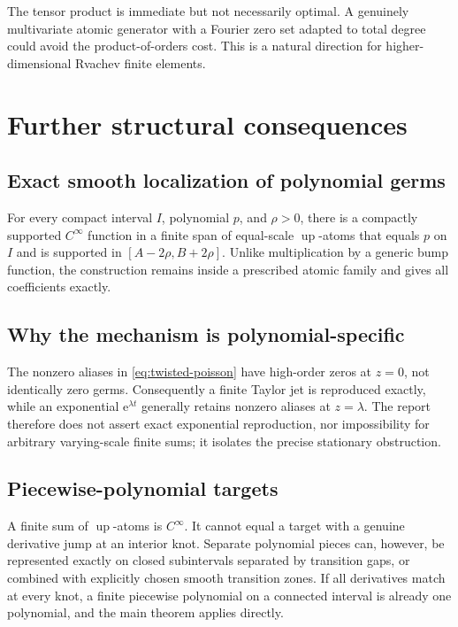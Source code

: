 \documentclass[11pt,oneside]{article}
\theoremstyle{definition}
\theoremstyle{remark}
\newcommand{\Up}{\operatorname{up}}
\newcommand{\e}{\mathrm e}
\begin{document}
The tensor product is immediate but not necessarily optimal.  A genuinely
multivariate atomic generator with a Fourier zero set adapted to total degree
could avoid the product-of-orders cost.  This is a natural direction for
higher-dimensional Rvachev finite elements.

\section{Further structural consequences}
\label{sec:consequences}

\subsection{Exact smooth localization of polynomial germs}

For every compact interval \(I\), polynomial \(p\), and \(\rho>0\), there is
a compactly supported \(C^\infty\) function in a finite span of equal-scale
\(\Up\)-atoms that equals \(p\) on \(I\) and is supported in
\([A-2\rho,B+2\rho]\).  Unlike multiplication by a generic bump function, the
construction remains inside a prescribed atomic family and gives all
coefficients exactly.

\subsection{Why the mechanism is polynomial-specific}

The nonzero aliases in \eqref{eq:twisted-poisson} have high-order zeros at
\(z=0\), not identically zero germs.  Consequently a finite Taylor jet is
reproduced exactly, while an exponential \(\e^{\lambda t}\) generally retains
nonzero aliases at \(z=\lambda\).  The report therefore does not assert exact
exponential reproduction, nor impossibility for arbitrary varying-scale
finite sums; it isolates the precise stationary obstruction.

\subsection{Piecewise-polynomial targets}

A finite sum of \(\Up\)-atoms is \(C^\infty\).  It cannot equal a target with
a genuine derivative jump at an interior knot.  Separate polynomial pieces
can, however, be represented exactly on closed subintervals separated by
transition gaps, or combined with explicitly chosen smooth transition zones.
If all derivatives match at every knot, a finite piecewise polynomial on a
connected interval is already one polynomial, and the main theorem applies
directly.
\end{document}

